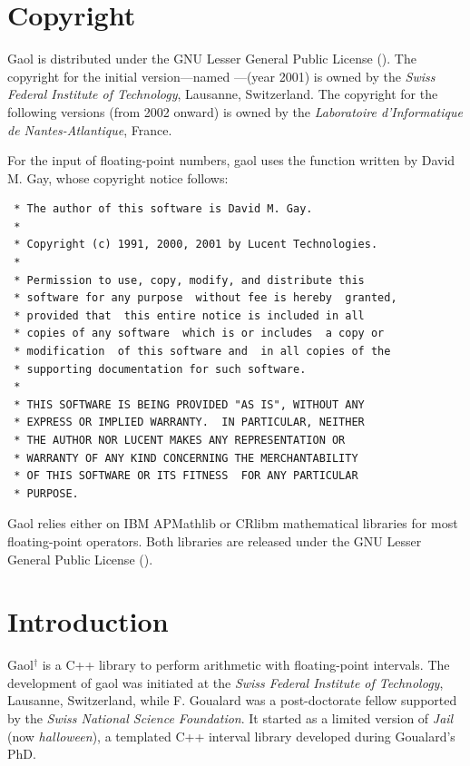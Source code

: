 \documentclass{manual}
\begin{document}
\cleardoublepage

\tableofcontents

\chapter*{Copyright}
Gaol is distributed under the GNU Lesser General Public License ().
The copyright for the initial version---named ---(year 2001) is owned by the
%
\emph{Swiss Federal Institute of Technology}, Lausanne, Switzerland.
The copyright for the following versions (from 2002 onward) is owned by the
\emph{Laboratoire d'Informatique de Nantes-Atlantique}, France.

\medskip
For the input of floating-point numbers, gaol uses the  function written
by David M. Gay, whose copyright notice follows:
%

\begin{verbatim}
 * The author of this software is David M. Gay.
 *
 * Copyright (c) 1991, 2000, 2001 by Lucent Technologies.
 *
 * Permission to use, copy, modify, and distribute this
 * software for any purpose  without fee is hereby  granted,
 * provided that  this entire notice is included in all
 * copies of any software  which is or includes  a copy or
 * modification  of this software and  in all copies of the
 * supporting documentation for such software.
 *
 * THIS SOFTWARE IS BEING PROVIDED "AS IS", WITHOUT ANY
 * EXPRESS OR IMPLIED WARRANTY.  IN PARTICULAR, NEITHER
 * THE AUTHOR NOR LUCENT MAKES ANY REPRESENTATION OR
 * WARRANTY OF ANY KIND CONCERNING THE MERCHANTABILITY
 * OF THIS SOFTWARE OR ITS FITNESS  FOR ANY PARTICULAR
 * PURPOSE.
\end{verbatim}


Gaol relies either on IBM APMathlib or CRlibm mathematical libraries for most floating-point
operators. Both libraries are released under the GNU Lesser General
Public License ().
%

\mainmatter


\chapter{Introduction}


Gaol$^\dag$
%
is a C++ library to perform arithmetic with floating-point intervals.
The development of gaol was initiated at the \emph{Swiss Federal
  Institute of Technology}, Lausanne, Switzerland, while F.  Goualard
was a post-doctorate fellow supported by the \emph{Swiss National Science
  Foundation}.  It started as a limited version of \emph{Jail} (now
\emph{halloween}), a templated C++ interval library developed during
Goualard's PhD.
\end{document}
